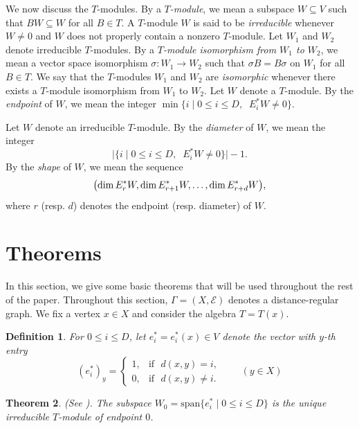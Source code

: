 \documentclass[12pt,letterpaper]{article}
\newtheorem{theorem}{Theorem}
\newtheorem{definition}[theorem]{Definition}
\begin{document}
We now discuss the $T$-modules. By a \emph{$T$-module}, we mean a subspace $W \subseteq V$ such that $BW \subseteq W$ for all $B \in T$. A $T$-module $W$ is said to be \emph{irreducible} whenever $W \ne 0$ and $W$ does not properly contain a nonzero $T$-module.  Let $W_1$ and $W_2$ denote irreducible $T$-modules. By a \textit{$T$-module isomorphism from $W_1$ to $W_2$}, we mean a vector space isomorphism $\sigma : W_1 \to W_2$ such that $\sigma B = B\sigma$ on $W_1$ for all $B \in T$. We say that the $T$-modules $W_1$ and $W_2$ are \textit{isomorphic} whenever there exists a $T$-module isomorphism from $W_1$ to $W_2$. Let $W$ denote a $T$-module. By the \emph{endpoint} of $W$, we mean the integer $\min\{i \mid 0\le i \le D,\;\; E_i^*W \ne 0\}$.

Let $W$ denote an irreducible $T$-module. By the {\it diameter} of $W$, we mean the integer
        $$\bigl \vert \lbrace i \mid 0 \leq i \leq D, \;\; E^*_i W \not=0 \rbrace \bigr\vert -1.$$
By the {\it shape} of $W$, we mean the sequence
       $$ \bigl({\rm dim}\, E^*_rW, {\rm dim}\, E^*_{r+1}W, \ldots, {\rm dim} \, E^*_{r+d}W \bigr),$$
where $r$ (resp. $d$) denotes the endpoint (resp. diameter) of $W$.

\section{Theorems}\label{subsec:thms} 


In this section, we give some basic theorems that will be used throughout the rest of the paper. Throughout this section, $\Gamma=(X,\mathcal{E})$ denotes a distance-regular graph. We fix a vertex $x \in X$ and consider the algebra $T=T(x)$.


\begin{definition}\label{def:primary} \rm
For $0\le i \le D$, let $e_i^*=e_i^*(x) \in V$ denote the vector with $y$-th entry
\[
(e_i^*)_y = 
\begin{cases} 1, & \mathrm{if} \text{ } d(x,y) = i, \\
0, & \mathrm{if} \text{ } d(x,y) \ne i. \end{cases} \quad\quad (y \in X)
\]
\end{definition}

\begin{theorem}\label{thm:primary} {\rm (See \cite[Lemma~7.1]{terwilliger2022}).}
The subspace $W_0=\mathrm{span}\{e_i^* \mid 0 \le i \le D\}$ is the unique irreducible $T$-module of endpoint $0$.
\end{theorem}
\end{document}
